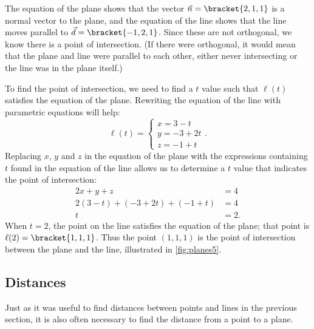 {The equation of the plane shows that the vector $\vec n =\bracket{2,1,1}$ is a normal vector to the plane, and the equation of the line shows that the line moves parallel to $\vec d =\bracket{-1,2,1}$. Since these are not orthogonal, we know there is a point of intersection. (If there were orthogonal, it would mean that the plane and line were parallel to each other, either never intersecting or the line was in the plane itself.)

To find the point of intersection, we need to find a $t$ value such that $\ell(t)$ satisfies the equation of the plane. Rewriting the equation of the line with parametric equations will help:
\[\ell(t) = \begin{cases}x=3-t\\y=-3+2t\\z=-1+t\end{cases}.\]%
%
Replacing $x$, $y$ and $z$ in the equation of the plane with the expressions containing $t$ found in the equation of the line allows us to determine a $t$ value that indicates the point of intersection:
\begin{align*}
2x+y+z &=4 \\
2(3-t) + (-3+2t) + (-1+t) &= 4 \\
t&=2.
\end{align*}
When $t=2$, the point on the line satisfies the equation of the plane; that point is $\ell(2) =\bracket{1,1,1}$. Thus the point $(1,1,1)$ is the point of intersection between the plane and the line, illustrated in \autoref{fig:planes5}.}

\subsection{Distances}

Just as it was useful to find distances between points and lines in the previous section, it is also often necessary to find the distance from a point to a plane.

